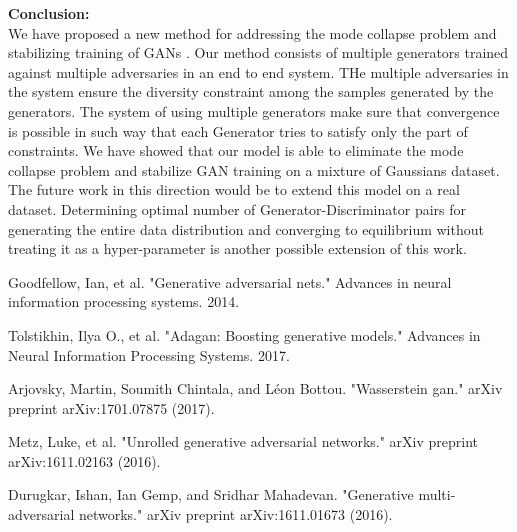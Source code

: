\documentclass[12pt]{article}
\begin{document}
\noindent\textbf{Conclusion:}\\

We have proposed a new method for addressing the mode collapse problem and stabilizing training of GANs . Our method consists of multiple generators trained against multiple adversaries in an end to end system. THe multiple adversaries in the system ensure the diversity constraint among the samples generated by the generators. The system of using multiple generators make sure that convergence is possible in such way that each Generator tries to satisfy only the part of constraints. We have showed that our model is able to eliminate the mode collapse problem and stabilize GAN training on a mixture of Gaussians dataset. The future work in this direction would be to extend this model on a real dataset. Determining optimal number of Generator-Discriminator pairs for generating the entire data distribution and converging to equilibrium without treating it as a hyper-parameter is another possible extension of this work.\\

\begin{thebibliography}{4}
	\bibitem{} 
	Goodfellow, Ian, et al. "Generative adversarial nets." Advances in neural information processing systems. 2014.
	
	\bibitem{} 
	Tolstikhin, Ilya O., et al. "Adagan: Boosting generative models." Advances in Neural Information Processing Systems. 2017.
	
	\bibitem{}
	Arjovsky, Martin, Soumith Chintala, and Léon Bottou. "Wasserstein gan." arXiv preprint arXiv:1701.07875 (2017).
	
	\bibitem{}
	Metz, Luke, et al. "Unrolled generative adversarial networks." arXiv preprint arXiv:1611.02163 (2016).
	
	\bibitem{}
	Durugkar, Ishan, Ian Gemp, and Sridhar Mahadevan. "Generative multi-adversarial networks." arXiv preprint arXiv:1611.01673 (2016).
\end{thebibliography}
\end{document}

